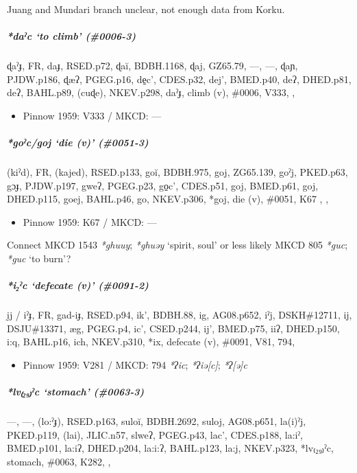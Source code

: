 \documentclass[a4paper,]{article}
\providecommand{\tightlist}{%
  \setlength{\itemsep}{0pt}\setlength{\parskip}{0pt}}
\let\oldsubparagraph\subparagraph
\renewcommand{\subparagraph}[1]{\oldsubparagraph{#1}\mbox{}}
\begin{document}
Juang and Mundari branch unclear, not enough data from Korku.

\subparagraph{\texorpdfstring{\emph{*daˀc} `to climb'
(\#0006-3)}{*daˀc to climb (\#0006-3)}}\label{daux2c0c-to-climb-0006-3}

ɖaˀɟ, FR, daɟ, RSED.p72, ɖaĭ, BDBH.1168, ɖaj, GZ65.79, ---, ---, ɖaɲ,
PJDW.p186, ɖæʔ, PGEG.p16, de̠c', CDES.p32, dej', BMED.p40, deʔ, DHED.p81,
deʔ, BAHL.p89, (cuɖe), NKEV.p298, daˀɟ, climb (v), \#0006, V333, ,

\begin{itemize}
\tightlist
\item
  Pinnow 1959: V333 / MKCD: ---
\end{itemize}

\subparagraph{\texorpdfstring{\emph{*goˀc/goj} `die (v)'
(\#0051-3)}{*goˀc/goj die (v) (\#0051-3)}}\label{goux2c0cgoj-die-v-0051-3}

(kiˀd), FR, (kajed), RSED.p133, goĭ, BDBH.975, goj, ZG65.139, goˀj,
PKED.p63, gɔɟ, PJDW.p197, gweʔ, PGEG.p23, go̠c', CDES.p51, goj, BMED.p61,
goj, DHED.p115, goej, BAHL.p46, go, NKEV.p306, *goj, die (v), \#0051,
K67 , ,

\begin{itemize}
\tightlist
\item
  Pinnow 1959: K67 / MKCD: ---
\end{itemize}

Connect MKCD 1543 \emph{*ghuuy}; \emph{*ghuəy} `spirit, soul' or less
likely MKCD 805 \emph{*guc}; \emph{*guc} `to burn'?

\subparagraph{\texorpdfstring{\emph{*i₂ˀc} `defecate (v)'
(\#0091-2)}{*i₂ˀc defecate (v) (\#0091-2)}}\label{iux2c0c-defecate-v-0091-2}

ḭj / iˀɟ, FR, gad-iɟ, RSED.p94, ik', BDBH.88, ig, AG08.p652, iˀj,
DSKH\#12711, ij, DSJU\#13371, æg, PGEG.p4, ic', CSED.p244, ij',
BMED.p75, iiʔ, DHED.p150, i:q, BAHL.p16, ich, NKEV.p310, *ix, defecate
(v), \#0091, V81, 794,

\begin{itemize}
\tightlist
\item
  Pinnow 1959: V281 / MKCD: 794 \emph{*ʔic}; \emph{*ʔiə{[}c{]}};
  \emph{*ʔ{[}ə{]}c}
\end{itemize}

\subparagraph{\texorpdfstring{\emph{*lv₍₂₉₎ˀc} `stomach'
(\#0063-3)}{*lv₍₂₉₎ˀc stomach (\#0063-3)}}\label{lvux2c0c-stomach-0063-3}

---, ---, (lo:ˀɟ), RSED.p163, suloĭ, BDBH.2692, suloj, AG08.p651,
la(i)ˀj, PKED.p119, (lai), JLIC.n57, slweʔ, PGEG.p43, lac', CDES.p188,
la:iˀ, BMED.p101, la:iʔ, DHED.p204, la:i:ʔ, BAHL.p123, la:j, NKEV.p323,
*lv₍₂₉₎ˀc, stomach, \#0063, K282, ,
\end{document}
